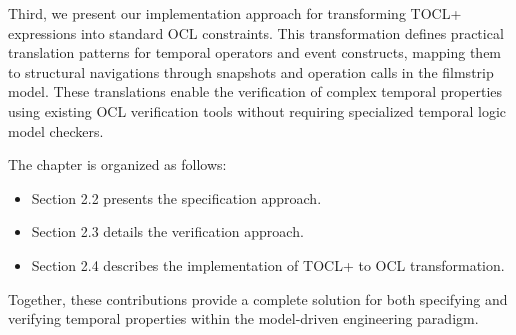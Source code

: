 Third, we present our implementation approach for transforming TOCL+ expressions into standard OCL constraints. This transformation defines practical translation patterns for temporal operators and event constructs, mapping them to structural navigations through snapshots and operation calls in the filmstrip model. These translations enable the verification of complex temporal properties using existing OCL verification tools without requiring specialized temporal logic model checkers.

The chapter is organized as follows:
\begin{itemize}
    \item Section 2.2 presents the specification approach.
    
    \item Section 2.3 details the verification approach.
    
    \item Section 2.4 describes the implementation of TOCL+ to OCL transformation.
\end{itemize}

Together, these contributions provide a complete solution for both specifying and 
verifying temporal properties within the model-driven engineering paradigm.
